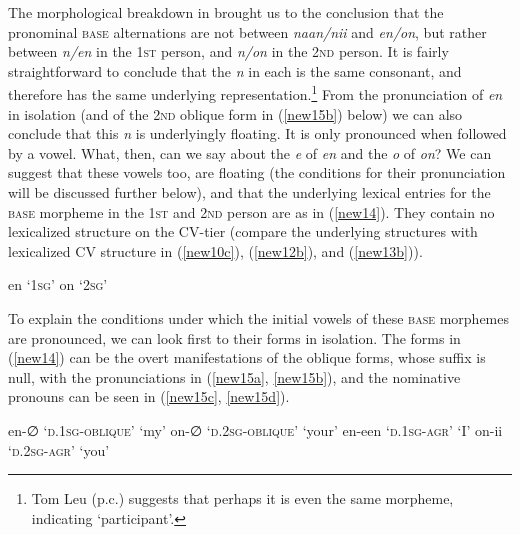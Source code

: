 \documentclass[output=paper]{langscibook}
\begin{document}
The morphological breakdown in  brought us to the conclusion that the pronominal \textsc{base} alternations are not between \textit{naan/nii} and \textit{en/on}, but rather between \textit{n/en} in the 1\textsc{st} person, and \textit{n/on} in the 2\textsc{nd} person. It is fairly straightforward to conclude that the \textit{n} in each is the same consonant, and therefore has the same underlying representation.\footnote{Tom Leu (p.c.) suggests that perhaps it is even the same morpheme, indicating ‘participant’.}  From the pronunciation of \textit{en} in isolation (and of the 2\textsc{nd} oblique form in (\ref{new15b}) below) we can also conclude that this \textit{n} is underlyingly floating. It is only pronounced when followed by a vowel. What, then, can we say about the \textit{e} of \textit{en} and the \textit{o} of \textit{on}? We can suggest that these vowels too, are floating (the conditions for their pronunciation will be discussed further below), and that the underlying lexical entries for the \textsc{base} morpheme in the 1\textsc{st} and 2\textsc{nd} person are as in (\ref{new14}). They contain no lexicalized structure on the CV-tier (compare the underlying structures with lexicalized CV structure in (\ref{new10c}), (\ref{new12b}), and (\ref{new13b})).

\begin{exe}
\ex \label{new14}
\begin{xlist}
\ex \label{new14a}
en	‘1\textsc{sg}’ 
\ex \label{new14b}
on	‘2\textsc{sg}’ 
\end{xlist}
\end{exe}

To explain the conditions under which the initial vowels of these \textsc{base} morphemes are pronounced, we can look first to their forms in isolation. The forms in (\ref{new14}) can be the overt manifestations of the oblique forms, whose suffix is null, with the pronunciations in (\ref{new15a}, \ref{new15b}), and the nominative pronouns can be seen in (\ref{new15c}, \ref{new15d}).

\begin{exe}
\ex \label{new15}
\begin{xlist}
\ex \label{new15a}
en-∅ \tab ‘\textsc{d}.1\textsc{sg-oblique}’	 \tab   [\textsuperscript{j}ẽ]  \tab   	‘my’ 
\ex \label{new15b}
on-∅ \tab ‘\textsc{d}.2\textsc{sg-oblique}’	 \tab   [wõ]  \tab ‘your’ 
\ex \label{new15c}
en-een \tab ‘\textsc{d}.1\textsc{sg-agr}’   \tab [nãã] \tab ‘I’ 
\ex \label{new15d}
on-ii \tab `\textsc{d}.2\textsc{sg-agr}’      \tab [nii]   \tab ‘you’ 
\end{xlist}
\end{exe}
\end{document}

